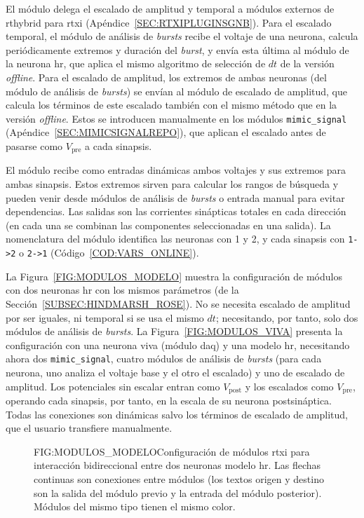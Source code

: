 El módulo delega el escalado de amplitud y temporal a módulos externos de \ac{rthybrid} para \ac{rtxi} (Apéndice~\ref{SEC:RTXIPLUGINSGNB}). Para el escalado temporal, el módulo de análisis de \textit{bursts} recibe el voltaje de una neurona, calcula periódicamente extremos y duración del \textit{burst}, y envía esta última al módulo de la neurona \ac{hr}, que aplica el mismo algoritmo de selección de \(dt\) de la versión \textit{offline}. Para el escalado de amplitud, los extremos de ambas neuronas (del módulo de análisis de \textit{bursts}) se envían al módulo de escalado de amplitud, que calcula los términos de este escalado también con el mismo método que en la versión \textit{offline}. Estos se introducen manualmente en los módulos \texttt{mimic\_signal} (Apéndice~\ref{SEC:MIMICSIGNALREPO}), que aplican el escalado antes de pasarse como $V_{\mathrm{pre}}$ a cada sinapsis.

El módulo recibe como entradas dinámicas ambos voltajes y sus extremos para ambas sinapsis. Estos extremos sirven para calcular los rangos de búsqueda y pueden venir desde módulos de análisis de \textit{bursts} o entrada manual para evitar dependencias. Las salidas son las corrientes sinápticas totales en cada dirección (en cada una se combinan las componentes seleccionadas en una salida). La nomenclatura del módulo identifica las neuronas con 1 y 2, y cada sinapsis con \texttt{1->2} o \texttt{2->1} (Código~\ref{COD:VARS_ONLINE}).

La Figura~\ref{FIG:MODULOS_MODELO} muestra la configuración de módulos con dos neuronas \ac{hr} con los mismos parámetros (de la Sección~\ref{SUBSEC:HINDMARSH_ROSE}). No se necesita escalado de amplitud por ser iguales, ni temporal si se usa el mismo $dt$; necesitando, por tanto, solo dos módulos de análisis de \textit{bursts}. La Figura~\ref{FIG:MODULOS_VIVA} presenta la configuración con una neurona viva (módulo \ac{daq}) y una modelo \ac{hr}, necesitando ahora dos \texttt{mimic\_signal}, cuatro módulos de análisis de \textit{bursts} (para cada neurona, uno analiza el voltaje base y el otro el escalado) y uno de escalado de amplitud. Los potenciales sin escalar entran como \(V_{\mathrm{post}}\) y los escalados como \(V_{\mathrm{pre}}\), operando cada sinapsis, por tanto, en la escala de su neurona postsináptica. Todas las conexiones son dinámicas salvo los términos de escalado de amplitud, que el usuario transfiere manualmente.

\begin{figure}[Esquema de módulos \acs{rtxi} para circuito bidireccional con dos neuronas modelo]{FIG:MODULOS_MODELO}{Configuración de módulos \ac{rtxi} para interacción bidireccional entre dos neuronas modelo \ac{hr}. Las flechas continuas son conexiones entre módulos (los textos origen y destino son la salida del módulo previo y la entrada del módulo posterior). Módulos del mismo tipo tienen el mismo color.}
\end{figure}

